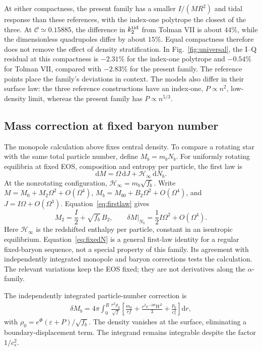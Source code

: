\documentclass[aps,prd,reprint,a4paper,nofootinbib,floatfix]{revtex4-2}
\newcommand{\dd}{\mathrm d}
\begin{document}
At either compactness, the present family has a smaller $I/(MR^2)$ and tidal response than these references, with the index-one polytrope the closest of the three. At $\mathcal C\simeq0.15885$, the difference in $k_2^{\rm tid}$ from Tolman VII is about $44\%$, while the dimensionless quadrupoles differ by about $15\%$. Equal compactness therefore does not remove the effect of density stratification. In Fig.~\ref{fig:universal}, the I--Q residual at this compactness is $-2.31\%$ for the index-one polytrope and $-0.54\%$ for Tolman VII, compared with $-2.83\%$ for the present family. The reference points place the family's deviations in context. The models also differ in their surface law: the three reference constructions have an index-one, $P\propto n^2$, low-density limit, whereas the present family has $P\propto n^{5/3}$.

\subsection{Mass correction at fixed baryon number}
The monopole calculation above fixes central density. To compare a rotating star with the same total particle number, define $M_b=m_bN_b$. For uniformly rotating equilibria at fixed EOS, composition and entropy per particle, the first law is~\cite{bardeen}
\begin{equation}
 \dd M=\Omega\,\dd J+\mathcal H_\infty\,\dd N_b.
 \label{eq:firstlaw}
\end{equation}
At the nonrotating configuration, $\mathcal H_\infty=m_b\sqrt{f_b}$. Write $M=M_0+M_2\Omega^2+O(\Omega^4)$, $M_b=M_{b0}+B_2\Omega^2+O(\Omega^4)$, and $J=I\Omega+O(\Omega^3)$. Equation~\eqref{eq:firstlaw} gives
\begin{equation}
 M_2=\frac I2+\sqrt{f_b}\,B_2,
 \qquad
 \left.\delta M\right|_{N_b}=\frac12I\Omega^2+O(\Omega^4).
 \label{eq:fixedN}
\end{equation}
Here $\mathcal H_\infty$ is the redshifted enthalpy per particle, constant in an isentropic equilibrium. Equation~\eqref{eq:fixedN} is a general first-law identity for a regular fixed-baryon sequence, not a special property of this family. Its agreement with independently integrated monopole and baryon corrections tests the calculation. The relevant variations keep the EOS fixed; they are not derivatives along the $\alpha$-family.

The independently integrated particle-number correction is
\begin{align}
 \delta M_b=4\pi\int_0^R\frac{r^2\rho_0}{\sqrt f}
 \left[\frac{m_0}{rf}+\frac{r^2e^{-2\Phi}W^2}{3}
                  +\frac{p_0}{c_s^2}\right]\dd r,
 \label{eq:baryon}
\end{align}
with $\rho_0=e^\Phi(\varepsilon+P)/\sqrt{f_b}$. The density vanishes at the surface, eliminating a boundary-displacement term. The integrand remains integrable despite the factor $1/c_s^2$.
\end{document}
